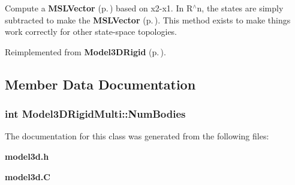 Compute a {\bf MSLVector} {\rm (p.\,\pageref{classMSLVector})} based on x2-x1. In R$^\wedge$n, the states are simply subtracted to make the {\bf MSLVector} {\rm (p.\,\pageref{classMSLVector})}. This method exists to make things work correctly for other state-space topologies.



Reimplemented from {\bf Model3DRigid} {\rm (p.\,\pageref{classModel3DRigid_a6})}.

\subsection{Member Data Documentation}
\subsubsection{\setlength{\rightskip}{0pt plus 5cm}int Model3DRigid\-Multi::Num\-Bodies}\label{classModel3DRigidMulti_m0}




The documentation for this class was generated from the following files:\begin{CompactItemize}
\item 
{\bf model3d.h}\item 
{\bf model3d.C}\end{CompactItemize}
